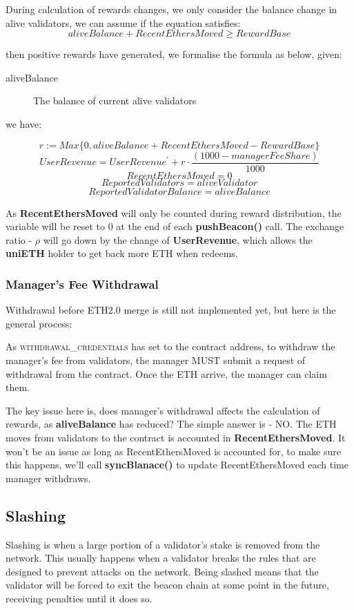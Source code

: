\documentclass{article}
\begin{document}
During calculation of rewards changes, we only consider the balance change in alive validators, we can assume if the equation satisfies:
\[aliveBalance + RecentEthersMoved \geq RewardBase\]

then positive rewards have generated, we formalise the formula as below, given:

\begin{description}
\item[aliveBalance] The balance of current alive validators
\end{description}
we have:

\begin{theorem}
\label{calcReward}
\[r := Max\{0, aliveBalance + RecentEthersMoved - RewardBase\}\]
\[UserRevenue = UserRevenue^{\prime} + r \cdot \frac{(1000 - managerFeeShare)}{1000}\]
\[RecentEthersMoved = 0\]
\[ReportedValidators = aliveValidator\]
\[ReportedValidatorBalance = aliveBalance\]
\end{theorem}

As \textbf{RecentEthersMoved} will only be counted during reward distribution, the variable will be reset to 0 at the end of each \textbf{pushBeacon()} call. The exchange ratio - $\rho$ will go down by the change of \textbf{UserRevenue}, which allows the \textbf{uniETH} holder to get back more ETH when redeems.

\subsubsection{Manager's Fee Withdrawal}
Withdrawal before ETH2.0 merge is still not implemented yet, but here is the general process: 

As \textsc{withdrawal\_credentials} has set to the contract address, to withdraw the manager's fee from validators, the manager MUST submit a request of withdrawal from the contract. Once the ETH arrive, the manager can claim them. 

The key issue here is, does manager's withdrawal affects the calculation of rewards, as \textbf{aliveBalance} has reduced? The simple answer is - NO. The ETH moves from validators to the contract is accounted in \textbf{RecentEthersMoved}. It won't be an issue as long as RecentEthersMoved is accounted for, to make sure this happens, we'll call \textbf{syncBlanace()} to update RecentEthersMoved each time manager withdraws.

\subsection{Slashing}
Slashing is when a large portion of a validator's stake is removed from the network. This usually happens when a validator breaks the rules that are designed to prevent attacks on the network. Being slashed means that the validator will be forced to exit the beacon chain at some point in the future, receiving penalties until it does so.
\end{document}
